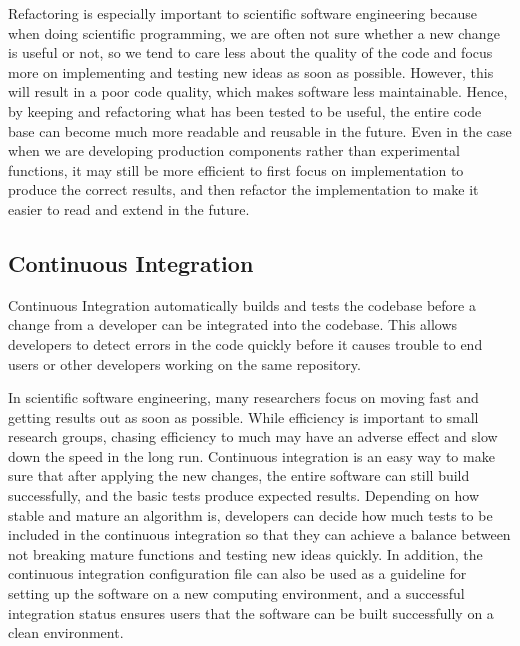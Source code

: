 Refactoring is especially important to scientific software engineering because when doing scientific programming, we are often not sure whether a new change is useful or not, 
so we tend to care less about the quality of the code and focus more on implementing and testing new ideas as soon as possible.
However, this will result in a poor code quality, which makes software less maintainable.
Hence, by keeping and refactoring what has been tested to be useful, the entire code base can become much more readable and reusable in the future.
Even in the case when we are developing production components rather than experimental functions, it may still be more efficient to first focus on implementation to produce the correct results, and then refactor the implementation to make it easier to read and extend in the future.

\subsection{Continuous Integration}
Continuous Integration automatically builds and tests the codebase before a change from a developer can be integrated into the codebase.
This allows developers to detect errors in the code quickly before it causes trouble to end users or other developers working on the same repository.

In scientific software engineering, many researchers focus on moving fast and getting results out as soon as possible.
While efficiency is important to small research groups, chasing efficiency to much may have an adverse effect and slow down the speed in the long run.
Continuous integration is an easy way to make sure that after applying the new changes, the entire software can still build successfully, and the basic tests produce expected results.
Depending on how stable and mature an algorithm is, developers can decide how much tests to be included in the continuous integration so that they can achieve a balance between not breaking mature functions and testing new ideas quickly.
In addition, the continuous integration configuration file can also be used as a guideline for setting up the software on a new computing environment, and a successful integration status ensures users that the software can be built successfully on a clean environment.
